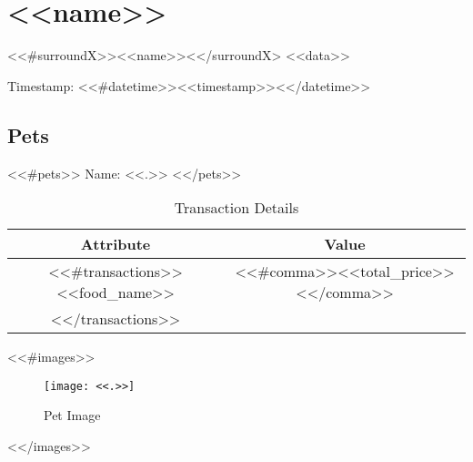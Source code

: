 \section{ <<name>> }
<<#surroundX>><<name>><</surroundX>
<<data>>

Timestamp: <<#datetime>><<timestamp>><</datetime>>

\subsection{Pets}
<<#pets>>
Name: <<.>>
<</pets>>

\begin{table}[h!]
\centering
\begin{tabular}{|c|c|}
\hline
Attribute & Value \\ \hline
<<#transactions>>
<<food_name>> & <<#comma>><<total_price>><</comma>> \\
<</transactions>>
\hline
\end{tabular}
\caption{Transaction Details}
\end{table}

<<#images>>
\begin{figure}[h!]
\centering
\texttt{[image: <<.>>]}
\caption{Pet Image}
\end{figure}
<</images>>
